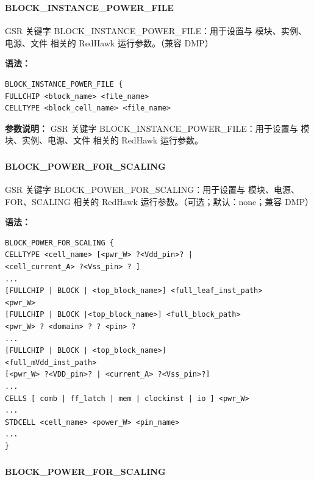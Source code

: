 \subsubsection{}
\paragraph*{BLOCK_INSTANCE_POWER_FILE}

GSR 关键字 BLOCK_INSTANCE_POWER_FILE：用于设置与 模块、实例、电源、文件 相关的 RedHawk 运行参数。（兼容 DMP）

\textbf{语法：}
\begin{lstlisting}
BLOCK_INSTANCE_POWER_FILE {
FULLCHIP <block_name> <file_name>
CELLTYPE <block_cell_name> <file_name>
\end{lstlisting}

\textbf{参数说明：}
GSR 关键字 BLOCK\_INSTANCE\_POWER\_FILE：用于设置与 模块、实例、电源、文件 相关的 RedHawk 运行参数。

\subsubsection{}
\paragraph*{BLOCK_POWER_FOR_SCALING}

GSR 关键字 BLOCK_POWER_FOR_SCALING：用于设置与 模块、电源、FOR、SCALING 相关的 RedHawk 运行参数。（可选；默认：none；兼容 DMP）

\textbf{语法：}
\begin{lstlisting}
BLOCK_POWER_FOR_SCALING {
CELLTYPE <cell_name> [<pwr_W> ?<Vdd_pin>? |
<cell_current_A> ?<Vss_pin> ? ]
...
[FULLCHIP | BLOCK | <top_block_name>] <full_leaf_inst_path>
<pwr_W>
[FULLCHIP | BLOCK |<top_block_name>] <full_block_path>
<pwr_W> ? <domain> ? ? <pin> ?
...
[FULLCHIP | BLOCK | <top_block_name>]
<full_mVdd_inst_path>
[<pwr_W> ?<VDD_pin>? | <current_A> ?<Vss_pin>?]
...
CELLS [ comb | ff_latch | mem | clockinst | io ] <pwr_W>
...
STDCELL <cell_name> <power_W> <pin_name>
...
}
\end{lstlisting}

\subsubsection{}
\paragraph*{BLOCK_POWER_FOR_SCALING}

